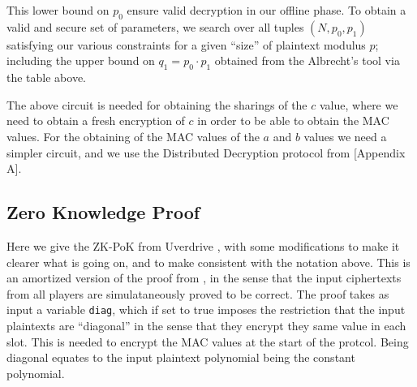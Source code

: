 This lower bound on $p_0$ ensure valid decryption in our offline phase.
To obtain a valid and secure set of parameters, we search over
all tuples $(N,p_0,p_1)$ satisfying our various constraints for
a given ``size'' of plaintext modulus $p$; including the upper bound
on $q_1=p_0 \cdot p_1$ obtained from the Albrecht's tool via 
the table above.

The above circuit is needed for obtaining the sharings of the $c$
value, where we need to obtain a fresh encryption of $c$ in order
to be able to obtain the MAC values.
For the obtaining of the MAC values of the $a$ and $b$ values
we need a simpler circuit, and we use the Distributed Decryption
protocol from \cite{KPR}[Appendix A].

\subsection{Zero Knowledge Proof}
Here we give the ZK-PoK from Uverdrive \cite{KPR}, with some modifications
to make it clearer what is going on, and to make 
consistent with the notation above.
This is an amortized version of the proof from \cite{SPDZ}, in the sense
that the input ciphertexts from all players are simulataneously proved to be
correct.
The proof takes as input a variable \verb+diag+, which if set to true
imposes the restriction that the input plaintexts are ``diagonal'' in
the sense that they encrypt they same value in each slot.
This is needed to encrypt the MAC values at the start of the protcol.
Being diagonal equates to the input plaintext polynomial being the constant
polynomial.

